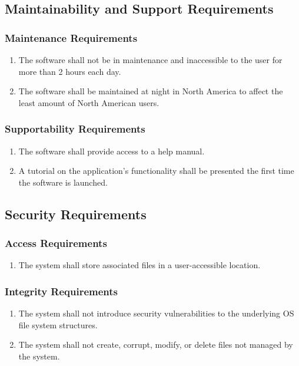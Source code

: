 \documentclass{article}
\begin{document}
\subsection{Maintainability and Support Requirements}
\subsubsection{Maintenance Requirements}
\begin{enumerate}
    \item The software shall not be in maintenance and inaccessible to the user for more than 2 hours each day.
    \item The software shall be maintained at night in North America to affect the least amount of North American users.
\end{enumerate}

\subsubsection{Supportability Requirements}
\begin{enumerate}
    \item The software shall provide access to a help manual.
    \item A tutorial on the application's functionality shall be presented the first time the software is launched.
\end{enumerate}

\subsection{Security Requirements}
\subsubsection{Access Requirements}
\begin{enumerate}
    \item The system shall store associated files in a user-accessible location.
\end{enumerate}

\subsubsection{Integrity Requirements}
\begin{enumerate}
    \item The system shall not introduce security vulnerabilities to the underlying OS file system structures.
    \item The system shall not create, corrupt, modify, or delete files not managed by the system.
\end{enumerate}
\end{document}
